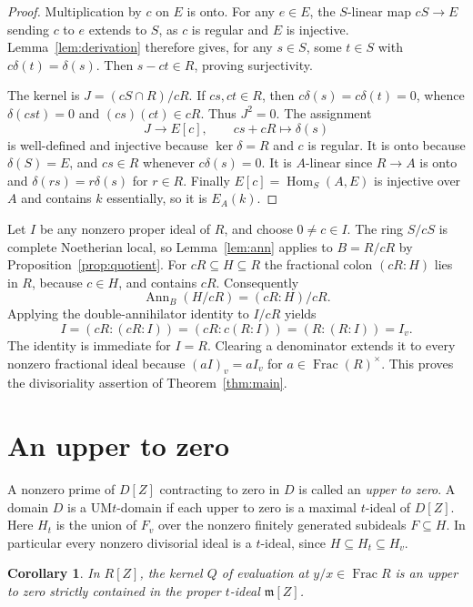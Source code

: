 \documentclass[11pt,reqno]{amsart}
\newtheorem{corollary}[theorem]{Corollary}
\DeclareMathOperator{\Ann}{Ann}
\DeclareMathOperator{\Frac}{Frac}
\DeclareMathOperator{\Hom}{Hom}
\newcommand{\m}{\mathfrak m}
\begin{document}
\begin{proof}
Multiplication by \(c\) on \(E\) is onto. For any \(e\in E\), the
\(S\)-linear map \(cS\to E\) sending \(c\) to \(e\) extends to \(S\),
as \(c\) is regular and \(E\) is injective. Lemma~\ref{lem:derivation}
therefore gives, for any \(s\in S\), some \(t\in S\) with
\(c\delta(t)=\delta(s)\). Then \(s-ct\in R\), proving surjectivity.

The kernel is \(J=(cS\cap R)/cR\). If \(cs,ct\in R\), then
\(c\delta(s)=c\delta(t)=0\), whence \(\delta(cst)=0\) and
\((cs)(ct)\in cR\). Thus \(J^2=0\). The assignment
\[
     J\longrightarrow E[c],\qquad cs+cR\longmapsto\delta(s)
\]
is well-defined and injective because \(\ker\delta=R\) and \(c\) is regular.
It is onto because \(\delta(S)=E\), and \(cs\in R\) whenever
\(c\delta(s)=0\). It is \(A\)-linear since \(R\to A\) is onto and
\(\delta(rs)=r\delta(s)\) for \(r\in R\).
Finally \(E[c]=\Hom_S(A,E)\) is injective over \(A\) and contains \(k\)
essentially, so it is \(E_A(k)\).
\end{proof}

Let \(I\) be any nonzero proper ideal of \(R\), and choose \(0\ne c\in I\).
The ring \(S/cS\) is complete Noetherian local, so
Lemma~\ref{lem:ann} applies to \(B=R/cR\) by
Proposition~\ref{prop:quotient}. For \(cR\subseteq H\subseteq R\) the
fractional colon \((cR:H)\) lies in \(R\), because \(c\in H\), and
contains \(cR\). Consequently
\[
    \Ann_B(H/cR)=(cR:H)/cR.
\]
Applying the double-annihilator identity to \(I/cR\) yields
\[
    I=(cR:(cR:I))=(cR:c(R:I))=(R:(R:I))=I_v .
\]
The identity is immediate for \(I=R\). Clearing a denominator extends it
to every nonzero fractional ideal because \((aI)_v=aI_v\) for
\(a\in\Frac(R)^\times\). This proves the divisoriality assertion of
Theorem~\ref{thm:main}.

\section{An upper to zero}

A nonzero prime of \(D[Z]\) contracting to zero in \(D\) is called an
\emph{upper to zero}. A domain \(D\) is a UM\(t\)-domain if each upper to
zero is a maximal \(t\)-ideal of \(D[Z]\). Here \(H_t\) is the union of
\(F_v\) over the nonzero finitely generated subideals \(F\subseteq H\).
In particular every nonzero divisorial ideal is a \(t\)-ideal, since
\(H\subseteq H_t\subseteq H_v\).

\begin{corollary}\label{cor:upper}
In \(R[Z]\), the kernel \(Q\) of evaluation at \(y/x\in\Frac R\) is an
upper to zero strictly contained in the proper \(t\)-ideal \(\m[Z]\).
\end{corollary}
\end{document}
